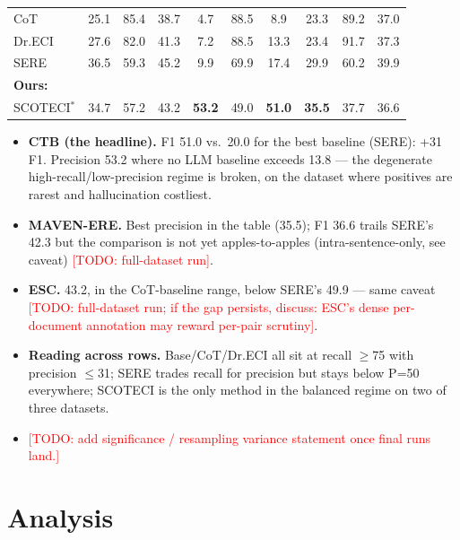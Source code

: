\documentclass[11pt]{article}
\newcommand{\todo}[1]{\textcolor{red}{[TODO: #1]}}
\newcommand{\method}{SCOTECI}
\begin{document}
\begin{table}[htbp]
\begin{tabular}{l ccc|ccc|ccc}
\quad CoT           & 25.1 & 85.4 & 38.7 & 4.7  & 88.5 & 8.9  & 23.3 & 89.2 & 37.0 \\
\quad Dr.ECI        & 27.6 & 82.0 & 41.3 & 7.2  & 88.5 & 13.3 & 23.4 & 91.7 & 37.3 \\
\quad SERE          & 36.5 & 59.3 & 45.2 & 9.9  & 69.9 & 17.4 & 29.9 & 60.2 & 39.9 \\
\midrule
\textbf{Ours:} & & & & & & & & & \\
\quad SCOTECI$^*$   & 34.7 & 57.2 & 43.2 & \textbf{53.2} & 49.0 & \textbf{51.0} & \textbf{35.5} & 37.7 & 36.6 \\
\bottomrule
\end{tabular}
\end{table}

\begin{itemize}
  \item \textbf{CTB (the headline).} F1 51.0 vs.\ 20.0 for the best baseline
        (SERE): +31 F1. Precision 53.2 where no LLM baseline exceeds 13.8 ---
        the degenerate high-recall/low-precision regime is broken, on the
        dataset where positives are rarest and hallucination costliest.
  \item \textbf{MAVEN-ERE.} Best precision in the table (35.5); F1 36.6 trails
        SERE's 42.3 but the comparison is not yet apples-to-apples
        (intra-sentence-only, see caveat) \todo{full-dataset run}.
  \item \textbf{ESC.} 43.2, in the CoT-baseline range, below SERE's 49.9 ---
        same caveat \todo{full-dataset run; if the gap persists, discuss:
        ESC's dense per-document annotation may reward per-pair scrutiny}.
  \item \textbf{Reading across rows.} Base/CoT/Dr.ECI all sit at recall
        $\ge$75 with precision $\le$31; SERE trades recall for precision but
        stays below P=50 everywhere; \method{} is the only method in the
        balanced regime on two of three datasets.
  \item \todo{add significance / resampling variance statement once final runs
        land.}
\end{itemize}

\section{Analysis}
\label{sec:analysis}
\end{document}
